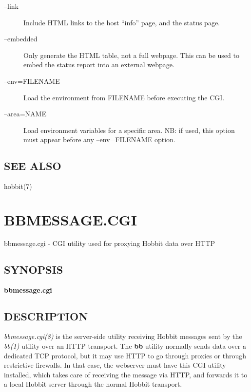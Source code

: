 \begin{description}
 

\item[--link] Include HTML links to the host ``info'' page, and the status page. 

 

\item[--embedded] Only generate the HTML table, not a full
  webpage. This can be used to embed the status report into an
  external webpage. 


 

\item[--env=FILENAME] Load the environment from FILENAME before executing the CGI. 

 

\item[--area=NAME] Load environment variables for a specific area. NB:
  if used, this option must appear before any --env=FILENAME option. 


 


\end{description}
\subsection{SEE ALSO}
hobbit(7) 

%
%
\newpage
\section{BBMESSAGE.CGI}

 bbmessage.cgi - CGI utility used for proxying Hobbit data over HTTP

 \subsection{SYNOPSIS}
\textbf{bbmessage.cgi}


 
\subsection{DESCRIPTION}
\emph{bbmessage.cgi(8)}
 is the server-side utility receiving Hobbit messages sent by the
 \emph{bb(1)} utility over an HTTP transport. The \textbf{bb} utility
 normally sends data over a dedicated TCP protocol, but it may use
 HTTP to go through proxies or through restrictive firewalls. In that
 case, the webserver must have this CGI utility installed, which takes
 care of receiving the message via HTTP, and forwards it to a local
 Hobbit server through the normal Hobbit transport. 


